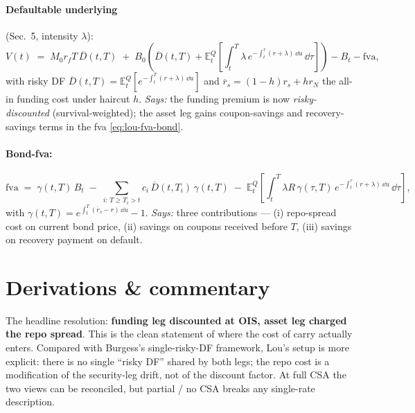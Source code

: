 \documentclass[11pt,a4paper]{article}
\begin{document}
\paragraph{Defaultable underlying} (Sec.\ 5, intensity $\lambda$):
\begin{equation}\label{eq:lou-defaultable-V}
  V(t) \;=\; M_0 r_f T\, \overline D(t, T) \;+\; B_0\!\left( \overline D(t, T) + \mathbb{E}^Q_t\!\left[ \int_t^T \lambda\, e^{-\int_t^\tau (r + \lambda)\,\dd u}\, \dd\tau \right]\right) - B_t - \mathrm{fva},
\end{equation}
with risky DF $\overline D(t, T) = \mathbb{E}^Q_t[e^{-\int_t^T (r + \lambda)\,\dd u}]$
and $\overline r_s = (1 - h) r_s + h r_N$ the all-in funding cost
under haircut $h$.
\textit{Says:} the funding premium is now \emph{risky-discounted}
(survival-weighted); the asset leg gains coupon-savings and
recovery-savings terms in the fva \eqref{eq:lou-fva-bond}.

\paragraph{Bond-fva:}
\begin{equation}\label{eq:lou-fva-bond}
  \mathrm{fva} \;=\; \gamma(t, T)\, B_t \;-\; \sum_{i:\, T \ge T_i > t} c_i\, \overline D(t, T_i)\, \gamma(t, T) \;-\; \mathbb{E}^Q_t\!\left[ \int_t^T \lambda R\, \gamma(\tau, T)\, e^{-\int_t^\tau (r + \lambda)\,\dd u}\, \dd\tau \right],
\end{equation}
with $\gamma(t, T) = e^{\int_t^T (\overline r_s - r)\,\dd u} - 1$.
\textit{Says:} three contributions ---  (i) repo-spread cost on
current bond price, (ii) savings on coupons received before $T$,
(iii) savings on recovery payment on default.

\section{Derivations \& commentary}

\begin{commentary}
The headline resolution: \textbf{funding leg discounted at OIS, asset
leg charged the repo spread}. This is the clean statement of where
the cost of carry actually enters. Compared with Burgess's
single-risky-DF framework, Lou's setup is more explicit: there is no
single ``risky DF'' shared by both legs; the repo cost is a
modification of the security-leg drift, not of the discount factor.
At full CSA the two views can be reconciled, but partial / no CSA
breaks any single-rate description.
\end{commentary}
\end{document}
